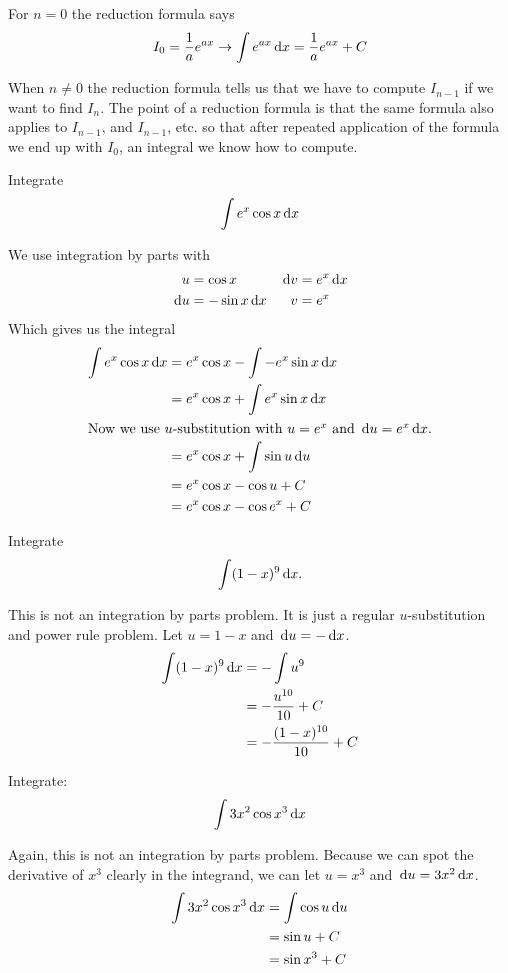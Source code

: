 For $n=0$ the reduction formula says
$$ I_0=\frac{1}{a}e^{ax} \to \int e^{ax}\,\mathrm{d} x = \frac{1}{a}e^{ax}+C $$

When $n \neq 0$ the reduction formula tells us that we have to compute $I_{n-1}$ if we want to find $I_n$. The point of a reduction formula is that the same formula also applies to $I_{n-1}$, and $I_{n-1}$, etc. so that after repeated application of the formula we end up with $I_0$, an integral we know how to compute.\cite{freenotes}
\begin{ex}
  Integrate
  \[ \int e^x \cos x \,\mathrm{d} x \]
  \begin{sol}
    We use integration by parts with
    \begin{align*}
      u &= \cos x & \,\mathrm{d} v &= e^x \,\mathrm{d} x \\
      \,\mathrm{d} u &= - \sin x \,\mathrm{d} x & v &=e^x
    \end{align*}
    Which gives us the integral
    \begin{align*}
      \int e ^x \cos x \,\mathrm{d} x &= e^x \cos x - \int -e^x \sin x \,\mathrm{d} x \\
      &= e^x \cos x+ \int e^x \sin x \,\mathrm{d} x \\
      \intertext{Now we use $u$-substitution with $u=e^x$ and $\,\mathrm{d} u = e^x \,\mathrm{d} x$.}
      &= e^x \cos x + \int \sin u \,\mathrm{d} u \\
      &= e^x \cos x - \cos u +C \\
      &= e^x \cos x - \cos {e^x} +C
    \end{align*}
  \end{sol}
\end{ex}
\begin{ex}
  Integrate
  \[ \int (1-x)^{9}\,\mathrm{d} x. \]
  \begin{sol}
    This is not an integration by parts problem.
    It is just a regular $u$-substitution and power rule problem.
    Let $u=1-x$ and $\,\mathrm{d} u = -\,\mathrm{d} x$.
    \begin{align*}
      \int (1-x)^9 \,\mathrm{d} x &= -\int u ^9 \\
      &= -\frac{u^{10}}{10}+C\\
      &= -\frac{(1-x)^{10}}{10}+C
    \end{align*}
  \end{sol}
\end{ex}
\begin{ex}
  Integrate:
  \[
    \int 3x^2 \cos x^3 \,\mathrm{d} x
    \]
  \begin{sol}
    Again, this is not an integration by parts problem.
    Because we can spot the derivative of $x^3$ clearly in the integrand,
    we can let $u=x^3$ and $\,\mathrm{d} u = 3x^2 \,\mathrm{d} x$.
    \begin{align*}
      \int 3x^2 \cos x^3 \,\mathrm{d} x & = \int \cos u \,\mathrm{d} u \\
      &= \sin u +C\\
      &= \sin {x^3}+C
    \end{align*}
  \end{sol}
\end{ex}
